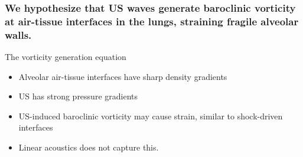 \begin{frame} \frametitle{We hypothesize that US waves generate baroclinic vorticity at air-tissue interfaces in the lungs, straining fragile alveolar walls.}%
  The vorticity generation equation\vspace{2pt}
  \vfill 
  \begin{minipage}{\textwidth}
    \begin{minipage}{0.5\textwidth}
      {\footnotesize
        \begin{itemize}%
        \item Alveolar air-tissue interfaces have sharp density gradients%
          \vspace*{6pt}%
        \item US has strong pressure gradients%
          \vspace*{6pt}%
        \item US-induced baroclinic vorticity may cause strain, similar to shock-driven interfaces%
          \vspace*{6pt}%
        \item Linear acoustics does not capture this.
        \end{itemize}
      }
    \end{minipage}
    \begin{minipage}{0.5\textwidth}
      \begin{figure}
        \centering
\end{figure}
\end{minipage}
\end{minipage}
\end{frame}
